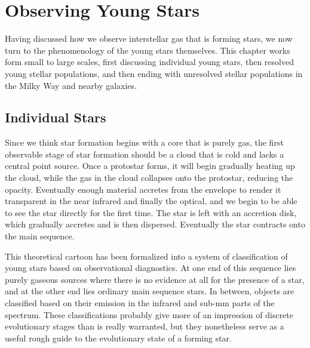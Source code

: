 \chapter{Observing Young Stars}
\label{ch:obsstars}


Having discussed how we observe interstellar gas that is forming stars, we now turn to the phenomenology of the young stars themselves. This chapter works form small to large scales, first discussing individual young stars, then resolved young stellar populations, and then ending with unresolved stellar populations in the Milky Way and nearby galaxies.

\section{Individual Stars}

Since we think star formation begins with a core that is purely gas, the first observable stage of star formation should be a cloud that is cold and lacks a central point source. Once a protostar forms, it will begin gradually heating up the cloud, while the gas in the cloud collapses onto the protostar, reducing the opacity. Eventually enough material accretes from the envelope to render it transparent in the near infrared and finally the optical, and we begin to be able to see the star directly for the first time. The star is left with an accretion disk, which gradually accretes and is then dispersed. Eventually the star contracts onto the main sequence.

This theoretical cartoon has been formalized into a system of classification of young stars based on observational diagnostics. At one end of this sequence lies purely gaseous sources where there is no evidence at all for the presence of a star, and at the other end lies ordinary main sequence stars. In between, objects are classified based on their emission in the infrared and sub-mm parts of the spectrum. These classifications probably give more of an impression of discrete evolutionary stages than is really warranted, but they nonetheless serve as a useful rough guide to the evolutionary state of a forming star.

